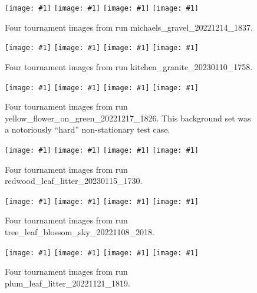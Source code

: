 \documentclass[letterpaper]{article}
\newcommand{\runID}{\footnotesize}
\newcommand{\igfour}[1]{\texttt{[image: \#1]}}
\begin{document}
\begin{figure}[H]
    \igfour{20221215_step_5867.png}
    \hfill
    \igfour{20221215_step_5892.png}
    \hfill
    \igfour{20221215_step_6830.png}
    \hfill
    \igfour{20221215_step_6916.png}
    \caption{Four tournament images from run {\runID michaels\_gravel\_20221214\_1837}.}
    \label{fig:michaels_gravel_4x}
\end{figure}

\begin{figure}[H]
    \igfour{20230111_step_5576.png}
    \hfill
    \igfour{20230111_step_6159.png}
    \hfill
    \igfour{20230111_step_6303.png}
    \hfill
    \igfour{20230111_step_6726.png}
    \caption{Four tournament images from run {\runID kitchen\_granite\_20230110\_1758}.}
    \label{fig:kitchen_granite_4x}
\end{figure}

\begin{figure}[H]
    \igfour{20221218_step_5396.png}
    \hfill
    \igfour{20221218_step_5641.png}
    \hfill
    \igfour{20221218_step_5947.png}
    \hfill
    \igfour{20221218_step_6753.png}
    \caption{Four tournament images from run {\runID yellow\_flower\_on\_green\_20221217\_1826}. This background set was a notoriously “hard” non-stationary test case.}
    \label{fig:yellow_flower_4x}
\end{figure}





\begin{figure}[H]
    \igfour{20230116_step_5868.png}
    \hfill
    \igfour{20230116_step_6057.png}
    \hfill
    \igfour{20230116_step_6347.png}
    \hfill
    \igfour{20230116_step_6814.png}
    \caption{Four tournament images from run {\runID redwood\_leaf\_litter\_20230115\_1730}.}
    \label{fig:redwood_leaf_litter_4x}
\end{figure}

\begin{figure}[H]
    \igfour{20221108_2018_step_4655.png}
    \hfill
    \igfour{20221108_2018_step_5498.png}
    \hfill
    \igfour{20221108_2018_step_5947.png}
    \hfill
    \igfour{20221108_2018_step_6562.png}
    \caption{Four tournament images from run {\runID tree\_leaf\_blossom\_sky\_20221108\_2018}.}
    \label{fig:tree_leaf_blossom_sky_4x}
\end{figure}

\begin{figure}[H]
    \igfour{20221121_1819_step_6324.png}
    \hfill
    \igfour{20221121_1819_step_6464.png}
    \hfill
    \igfour{20221121_1819_step_6677.png}
    \hfill
    \igfour{20221121_1819_step_6755.png}
    \caption{Four tournament images from run {\runID plum\_leaf\_litter\_20221121\_1819}.}
    \label{fig:plum_leaf_litter_4x}
\end{figure}
\end{document}
